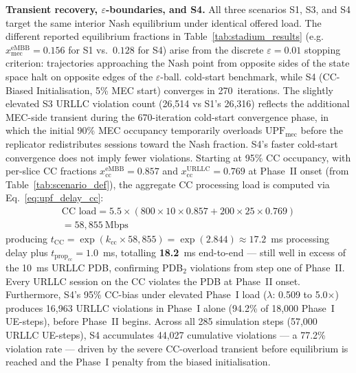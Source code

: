 \documentclass[conference]{IEEEtran}
\begin{document}
\textbf{Transient recovery, $\varepsilon$-boundaries, and S4.}
All three scenarios S1, S3, and S4 target the same interior Nash
equilibrium under identical offered load. The different reported
equilibrium fractions in Table~\ref{tab:stadium_results} (e.g.\
$x_\text{mec}^\text{eMBB} = 0.156$ for S1 vs.\ $0.128$ for S4)
arise from the discrete $\varepsilon = 0.01$ stopping criterion:
trajectories approaching the Nash point from opposite sides of
the state space halt on opposite edges of the $\varepsilon$-ball.
cold-start benchmark, while S4 (CC-Biased Initialisation, 5\%
MEC start) converges in 270~iterations. The slightly elevated
S3 URLLC violation count (26,514 vs S1's 26,316) reflects the
additional MEC-side transient during the 670-iteration cold-start
convergence phase, in which the initial 90\% MEC occupancy temporarily
overloads $\text{UPF}_\text{mec}$ before the replicator redistributes
sessions toward the Nash fraction. S4's faster cold-start
convergence does not imply fewer violations. Starting at 95\%
CC occupancy, with per-slice CC fractions $x_\text{cc}^\text{eMBB}
= 0.857$ and $x_\text{cc}^\text{URLLC} = 0.769$ at Phase~II onset
(from Table~\ref{tab:scenario_def}), the aggregate CC processing
load is computed via Eq.~\eqref{eq:upf_delay_cc}:
\begin{multline*}
  \text{CC load} = 5.5 \times
    (800 \times 10 \times 0.857 + 200 \times 25 \times 0.769) \\
  = 58{,}855~\text{Mbps}
\end{multline*}
producing $t_\text{CC} = \exp(k_\text{cc} \times 58{,}855)
= \exp(2.844) \approx 17.2$~ms processing delay plus
$t_{\text{prop}_\text{cc}} = 1.0$~ms, totalling \textbf{18.2}~ms
end-to-end --- still well in excess of the 10~ms URLLC PDB,
confirming PDB$_2$ violations from step one of Phase~II. Every
URLLC session on the CC violates the PDB at Phase~II onset.
Furthermore, S4's 95\% CC-bias under elevated Phase~I load
($\lambda$: 0.509 to 5.0$\times$) produces 16,963 URLLC violations
in Phase~I alone (94.2\% of 18,000 Phase~I UE-steps), before
Phase~II begins. Across all 285 simulation steps (57,000 URLLC
UE-steps), S4 accumulates 44,027 cumulative violations --- a
77.2\% violation rate --- driven by the severe CC-overload
transient before equilibrium is reached and the Phase~I penalty
from the biased initialisation.
\end{document}
